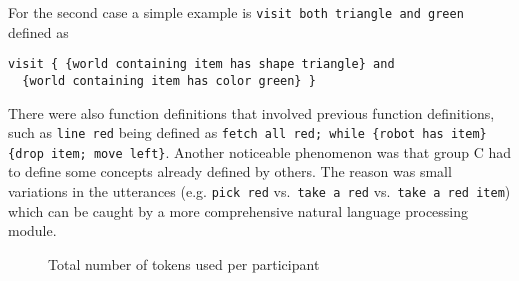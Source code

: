 For the second case a simple example is
\lstinline{visit both triangle and green} defined as
\begin{lstlisting}
visit { {world containing item has shape triangle} and
  {world containing item has color green} }
\end{lstlisting}
There were also function definitions that involved previous function definitions,
such as \lstinline{line red} being defined as
\lstinline$fetch all red; while {robot has item} {drop item; move left}$.
Another noticeable phenomenon was that group C had to define some concepts already defined by others.
The reason was small variations in the utterances (e.g. \lstinline{pick red} vs.\
\lstinline{take a red} vs.\ \lstinline{take a red item}) which can be caught by a more
comprehensive natural language processing module.


\begin{figure}[t!]

	\caption{Total number of tokens used per participant}
	\label{fig:numTokens}
	\end{figure}






